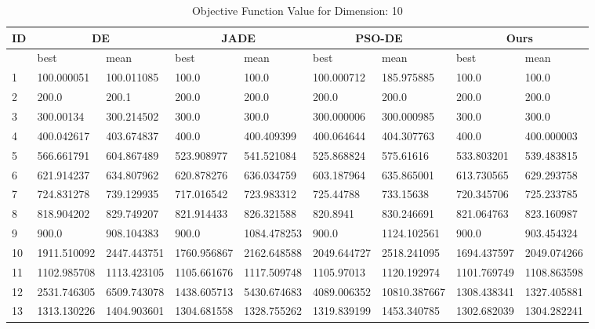 \begingroup
\renewcommand\arraystretch{0.7}
\begin{table*}[t]
\centering
\caption{Objective Function Value for Dimension: 10}
 \begin{tabular}{|p{0.8cm}|p{1.6cm}|p{1.6cm}|p{1.6cm}|p{1.6cm}|p{1.6cm}|p{1.6cm}|p{1.6cm}|p{1.6cm}|} 
 \hline
 ID & \multicolumn{2}{c|}{DE} & \multicolumn{2}{c|}{JADE} & \multicolumn{2}{c|}{PSO-DE} & \multicolumn{2}{c|}{Ours} \\
 \hline
    & best & mean & best & mean & best & mean & best & mean \\ [0.5ex] 
 \hline
1  & 100.000051 & 100.011085 & 100.0 & 100.0 & 100.000712 & 185.975885 & 100.0 & 100.0 \\ 
2  & 200.0 & 200.1 & 200.0 & 200.0 & 200.0 & 200.0 & 200.0 & 200.0 \\ 
3  & 300.00134 & 300.214502 & 300.0 & 300.0 & 300.000006 & 300.000985 & 300.0 & 300.0 \\ 
4  & 400.042617 & 403.674837 & 400.0 & 400.409399 & 400.064644 & 404.307763 & 400.0 & 400.000003 \\ 
5  & 566.661791 & 604.867489 & 523.908977 & 541.521084 & 525.868824 & 575.61616 & 533.803201 & 539.483815 \\ 
6  & 621.914237 & 634.807962 & 620.878276 & 636.034759 & 603.187964 & 635.865001 & 613.730565 & 629.293758 \\ 
7  & 724.831278 & 739.129935 & 717.016542 & 723.983312 & 725.44788 & 733.15638 & 720.345706 & 725.233785 \\ 
8  & 818.904202 & 829.749207 & 821.914433 & 826.321588 & 820.8941 & 830.246691 & 821.064763 & 823.160987 \\ 
9  & 900.0 & 908.104383 & 900.0 & 1084.478253 & 900.0 & 1124.102561 & 900.0 & 903.454324 \\ 
10  & 1911.510092 & 2447.443751 & 1760.956867 & 2162.648588 & 2049.644727 & 2518.241095 & 1694.437597 & 2049.074266 \\ 
11  & 1102.985708 & 1113.423105 & 1105.661676 & 1117.509748 & 1105.97013 & 1120.192974 & 1101.769749 & 1108.863598 \\ 
12  & 2531.746305 & 6509.743078 & 1438.605713 & 5430.674683 & 4089.006352 & 10810.387667 & 1308.438341 & 1327.405881 \\ 
13  & 1313.130226 & 1404.903601 & 1304.681558 & 1328.755262 & 1319.839199 & 1453.340785 & 1302.682039 & 1304.282241 \\ 

\end{tabular}
\end{table*}
